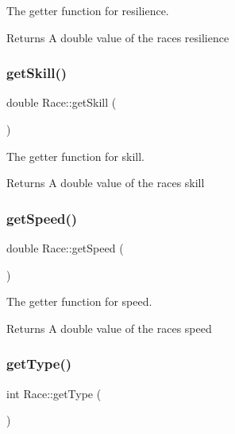 The getter function for resilience. 

\begin{DoxyReturn}{Returns}
A double value of the race\textquotesingle{}s resilience 
\end{DoxyReturn}
\mbox{\label{class_race_aee463d08816aef0916a7f56821cc8eca}} 
\subsubsection{\texorpdfstring{getSkill()}{getSkill()}}
{\footnotesize\ttfamily double Race\+::get\+Skill (\begin{DoxyParamCaption}{ }\end{DoxyParamCaption})}



The getter function for skill. 

\begin{DoxyReturn}{Returns}
A double value of the race\textquotesingle{}s skill 
\end{DoxyReturn}
\mbox{\label{class_race_ada1056031aa39b26d1ffe522a56ca70c}} 
\subsubsection{\texorpdfstring{getSpeed()}{getSpeed()}}
{\footnotesize\ttfamily double Race\+::get\+Speed (\begin{DoxyParamCaption}{ }\end{DoxyParamCaption})}



The getter function for speed. 

\begin{DoxyReturn}{Returns}
A double value of the race\textquotesingle{}s speed 
\end{DoxyReturn}
\mbox{\label{class_race_a8329ee6c2098b295dda293142b47e064}} 
\subsubsection{\texorpdfstring{getType()}{getType()}}
{\footnotesize\ttfamily int Race\+::get\+Type (\begin{DoxyParamCaption}{ }\end{DoxyParamCaption})}



